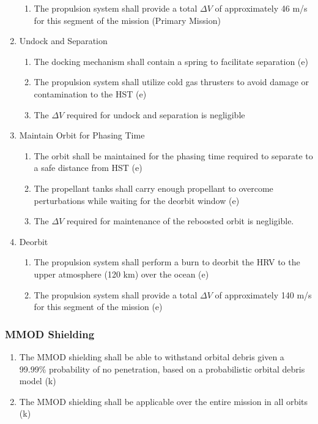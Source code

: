 \documentclass[paper=letter, fontsize=11pt]{scrartcl} %
\numberwithin{equation}{section} %
\numberwithin{figure}{section} %
\numberwithin{table}{section} %
\begin{document}
\begin{enumerate}
\begin{enumerate}
            \item The propulsion system shall provide a total $\Delta V$ of approximately 46 m/s for this segment of the mission (Primary Mission)
          \end{enumerate}
    \item Undock and Separation
          \begin{enumerate}
            \item The docking mechanism shall contain a spring to facilitate separation (e)
            \item The propulsion system shall utilize cold gas thrusters to avoid damage or contamination to the HST (e)
            \item The $\Delta V$ required for undock and separation is negligible
          \end{enumerate}
    \item Maintain Orbit for Phasing Time
          \begin{enumerate}
            \item The orbit shall be maintained for the phasing time required to separate to a safe distance from HST (e)
            \item The propellant tanks shall carry enough propellant to overcome perturbations while waiting for the deorbit window (e)
            \item The $\Delta V$ required for maintenance of the reboosted orbit is negligible.
          \end{enumerate}
    \item Deorbit
          \begin{enumerate}
            \item The propulsion system shall perform a burn to deorbit the HRV to the upper atmosphere (120 km) over the ocean (e)
            \item The propulsion system shall provide a total $\Delta V$ of approximately 140 m/s for this segment of the mission (e)
          \end{enumerate}
\end{enumerate}


\subsubsection{MMOD Shielding}
\begin{enumerate}
    \item The MMOD shielding shall be able to withstand orbital debris given a 99.99\% probability of no penetration, based on a probabilistic orbital debris model (k)
    \item The MMOD shielding shall be applicable over the entire mission in all orbits (k)
\end{enumerate}
\end{document}
